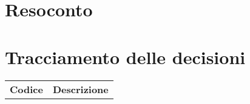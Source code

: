 \documentclass{article}
\begin{document}
\section{Resoconto}%
\label{resoconto}
\paragraph*{}

\section{Tracciamento delle decisioni}
\begin{table}[H]
  \centering
  \begin{tabular}{p{4cm}|p{12cm}}
    \rowcolor{lightgray}
    \textbf{Codice}  & \textbf{Descrizione}      \\
  \end{tabular}
\end{table}
\end{document}
